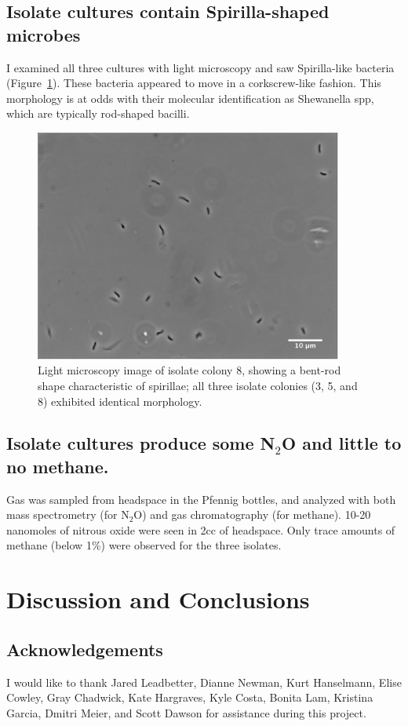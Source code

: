 \documentclass{article}
\begin{document}
\subsection*{Isolate cultures contain Spirilla-shaped microbes}

I examined all three cultures with light microscopy and saw
Spirilla-like bacteria (Figure~\ref{fig:spirilla}).  These bacteria
appeared to move in a corkscrew-like fashion.  This morphology is at
odds with their molecular identification as Shewanella spp, which are
typically rod-shaped bacilli.

\begin{figure}[!ht]
  \centerline{\includegraphics[width=4in]{spirilla.png}}
  \caption{Light microscopy image of isolate colony 8, showing a
    bent-rod shape characteristic of spirillae; all three isolate
    colonies (3, 5, and 8) exhibited identical morphology.}
  \label{fig:spirilla}
\end{figure}

\subsection*{Isolate cultures produce some N$_2$O and little to no methane.}

Gas was sampled from headspace in the Pfennig bottles, and analyzed
with both mass spectrometry (for N$_2$O) and gas chromatography (for
methane).  10-20 nanomoles of nitrous oxide were seen in 2cc of
headspace.  Only trace amounts of methane (below 1\%) were observed
for the three isolates.

\section*{Discussion and Conclusions}

\subsection*{Acknowledgements}

I would like to thank Jared Leadbetter, Dianne Newman, Kurt Hanselmann,
Elise Cowley, Gray Chadwick, Kate Hargraves, Kyle Costa, Bonita Lam,
Kristina Garcia, Dmitri Meier, and Scott Dawson for assistance during
this project.

\end{document}
